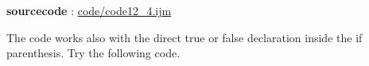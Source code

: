 \textbf{sourcecode} : \href{http://www.example.com/contents}{code/code12\_4.ijm}

The code works also with the direct true or false
declaration inside the if parenthesis. Try the following code.